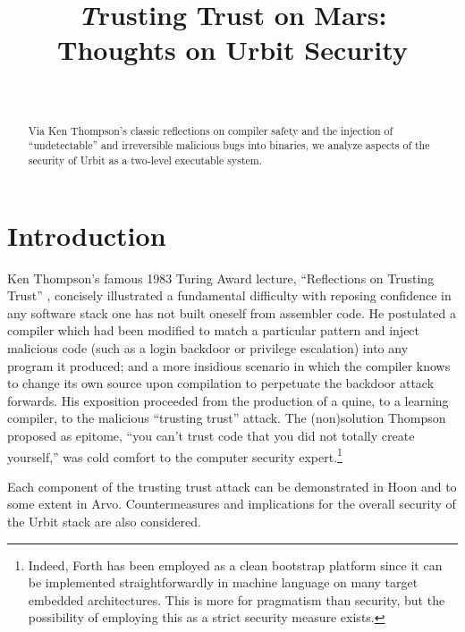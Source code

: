 \documentclass[twoside]{article}
\title{{\emph Trusting Trust} on Mars: \\ Thoughts on Urbit Security}
\author{\authorname~\authorpatp \\ \affiliation}
\date{}
\begin{document}
\maketitle
\thispagestyle{firststyle}

\begin{abstract}
Via Ken Thompson's classic reflections on compiler safety and the injection of “undetectable” and irreversible malicious bugs into binaries, we analyze aspects of the security of Urbit as a two-level executable system.
\end{abstract}

\setcounter{page}{1}

\tableofcontents

\section{Introduction}

Ken Thompson's famous 1983 Turing Award lecture, “Reflections on Trusting Trust” \citep{Thompson1984}, concisely illustrated a fundamental difficulty with reposing confidence in any software stack one has not built oneself from assembler code.  He postulated a compiler which had been modified to match a particular pattern and inject malicious code (such as a login backdoor or privilege escalation) into any program it produced; and a more insidious scenario in which the compiler knows to change its own source upon compilation to perpetuate the backdoor attack forwards.  His exposition proceeded from the production of a quine, to a learning compiler, to the malicious “trusting trust” attack.  The (non)solution Thompson proposed as epitome, “you can't trust code that you did not totally create yourself,” was cold comfort to the computer security expert.\footnote{Indeed, Forth has been employed as a clean bootstrap platform since it can be implemented straightforwardly in machine language on many target embedded architectures.  This is more for pragmatism than security, but the possibility of employing this as a strict security measure exists.}

Each component of the trusting trust attack can be demonstrated in Hoon and to some extent in Arvo.  Countermeasures and implications for the overall security of the Urbit stack are also considered.

\end{document}
